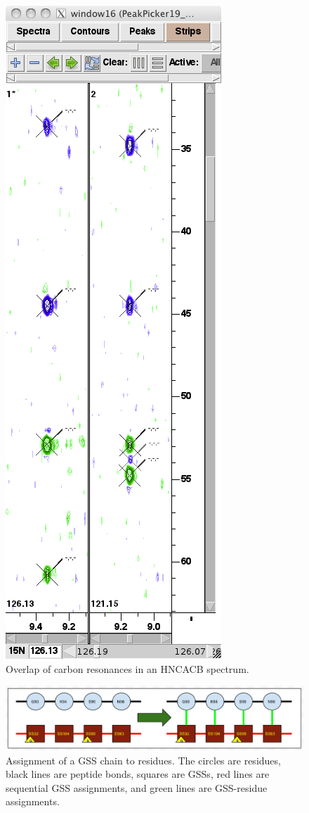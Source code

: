 \begin{figure}
  \includegraphics[scale=0.35]{figures/hncacb_overlap}
  \caption{Overlap of carbon resonances in an HNCACB spectrum.}
  \label{hncacb_overlap}
\end{figure}

\begin{figure}
  \includegraphics[scale=0.45]{figures/ss-residue}
  \caption[Assignment of a GSS chain to residues]
          {Assignment of a GSS chain to residues.  The circles are residues,
           black lines are peptide bonds, squares are GSSs, red lines are 
           sequential GSS assignments, and green lines are GSS-residue 
           assignments.}
  \label{ss-residue}
\end{figure}


